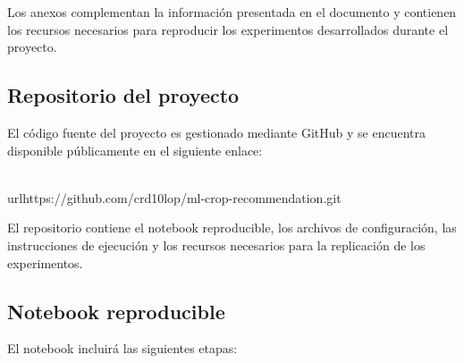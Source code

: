 \documentclass[conference]{IEEEtran}
\begin{document}
Los anexos complementan la información presentada en el documento y contienen los recursos necesarios para reproducir los experimentos desarrollados durante el proyecto.


\subsection{Repositorio del proyecto}

El código fuente del proyecto es gestionado mediante GitHub y se encuentra disponible públicamente en el siguiente enlace:

\begin{center} 
    \\url{https://github.com/crd10lop/ml-crop-recommendation.git} 
\end{center}

El repositorio contiene el notebook reproducible, los archivos de configuración, las instrucciones de ejecución y los recursos necesarios para la replicación de los experimentos.


\subsection{Notebook reproducible}

El notebook incluirá las siguientes etapas:
\end{document}
